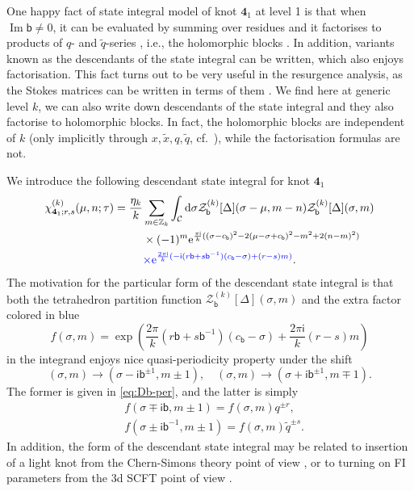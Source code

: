 \documentclass[a4paper,11pt]{article}	%
\DeclareMathOperator{\imag}{Im}
\def\mc{\mathcal}
\def\md{\mathbf}
\def\ms{\mathsf}
\def\IZ{\mathbb{Z}}
\def\tq{\tilde{q}}
\def\tx{\tilde{x}}
\newcommand{\re}{{\rm e}}
\newcommand{\ri}{{\mathsf{i}}}
\newcommand{\rd}{{\rm d}}
\newcommand{\nn}{\nonumber \\}
\newcommand{\bb}{\ms{b}}
\newcommand{\knot}[1]{\md{#1}}
\begin{document}
One happy fact of state integral model of knot $\knot{4}_1$ at level 1
is that when $\imag{\bb}\neq 0$, it can be evaluated by summing over
residues and it factorises to products of $q$- and $\tq$-series
\cite{Garoufalidis:2013rca}, i.e., the holomorphic blocks
\cite{Beem:2012mb}.  In addition, variants known as the descendants of
the state integral can be written, which also enjoys factorisation.
This fact turns out to be very useful in the resurgence analysis, as
the Stokes matrices can be written in terms of them
\cite{Garoufalidis:2020xec,Garoufalidis:2020nut}.  We find here at
generic level $k$, we can also write down descendants of the state
integral and they also factorise to holomorphic blocks.  In fact, the
holomorphic blocks are independent of $k$ (only implicitly through
$x,\tx,q,\tq$, cf.~\cite{Dimofte:2014zga}), while the factorisation
formulas are not.

We introduce the following descendant state integral for knot
$\knot{4}_1$
\begin{align}
  \chi^{(k)}_{\knot{4}_1;r,s}(\mu,n;\tau) = \frac{\eta_k}{k}
  &\sum_{m\in\IZ_k}\int_{\mc{C}}
    \rd \sigma \mc{Z}_\bb^{(k)}[\Delta](\sigma-\mu,m-n)
    \mc{Z}_{\bb}^{(k)}[\Delta](\sigma,m)\nn
  &\times(-1)^m
    \re^{\frac{\pi\ri}{k}((\sigma-c_\bb)^2-2(\mu-\sigma+c_\bb)^2-m^2+2(n-m)^2)}\nn
  &\textcolor{blue}
    {\times\re^{\frac{2\pi\ri}{k}(-\ri(r\bb+s\bb^{-1})(c_\bb-\sigma)+(r-s)m)}}.
\end{align}
The motivation for the particular form of the descendant state
integral is that both the tetrahedron partition function
$\mc{Z}_\bb^{(k)}[\Delta](\sigma,m)$ and the extra factor colored in blue
\begin{equation}
  f(\sigma,m) = \exp\left(\frac{2\pi}{k}(r\bb+s\bb^{-1})(c_\bb-\sigma)
    +\frac{2\pi\ri}{k}(r-s)m\right)
\end{equation}
in the integrand enjoys nice quasi-periodicity property under the
shift
\begin{equation}
  (\sigma,m) \rightarrow (\sigma-\ri\bb^{\pm 1},m \pm 1),\quad
  (\sigma,m) \rightarrow (\sigma+\ri\bb^{\pm 1},m \mp 1).
\end{equation}
The former is given in \eqref{eq:Db-per}, and the latter is simply
\begin{subequations}
\begin{align}
  &f(\sigma\mp\ri\bb,m \pm 1) = f(\sigma,m) q^{\pm r},\\
  &f(\sigma\pm\ri\bb^{-1},m \pm 1) = f(\sigma,m)\tq^{\pm s}.
\end{align}
\end{subequations}
In addition, the form of the descendant state integral may be related
to insertion of a light knot from the Chern-Simons theory point of
view \cite{Agarwal:2022cdm}, or to turning on FI parameters from the
3d SCFT point of view \cite{Yoshida:2014ssa}.
\end{document}
